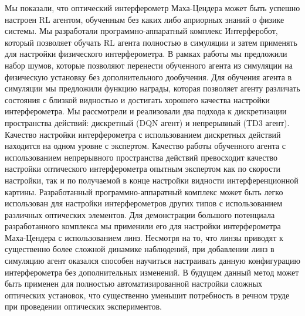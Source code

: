 Мы показали, что оптический интерферометр Маха-Цендера может быть успешно настроен RL агентом, обученным без каких либо априорных знаний о физике системы. 
Мы разработали программно-аппаратный комплекс Интерферобот, который позволяет обучать RL агента полностью в симуляции и затем применять для настройки физического интерферометра. В рамках работы мы предложили набор шумов, которые позволяют перенести обученного агента из симуляции на физическую установку без дополнительного дообучения. Для обучения агента в симуляции мы предложили функцию награды, которая позволяет агенту различать состояния с близкой видностью и достигать хорошего качества настройки интерферометра. 
Мы рассмотрели и реализовали два подхода к дискретизации пространства действий: дискретный (DQN агент) и непрерывный (TD3 агент). Качество настройки интерферометра с использованием дискретных действий находится на одном уровне с экспертом. Качество работы обученного агента с использованием непрерывного пространства действий превосходит качество настройки оптического интерферометра опытным экспертом как по скорости настройки, так и по получаемой в конце настройки видности интерференционной картины. 
Разработанный программно-аппаратный комплекс может быть легко использован для настройки интерферометров других типов с использованием различных оптических элементов. Для демонстрации большого потенциала разработанного комплекса мы применили его для настройки интерферометра Маха-Цендера с использованием линз. Несмотря на то, что линзы приводят к существенно более сложной динамике наблюдений, при добавлении линз в симуляцию агент оказался способен научиться настраивать данную конфигурацию интерферометра без дополнительных изменений. В будущем данный метод может быть применен для полностью автоматизированной настройки сложных оптических установок, что существенно уменьшит потребность в речном труде при проведении оптических экспериментов.  


\FloatBarrier
